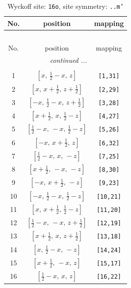 \documentclass[fleqn,8pt]{jsarticle}
\begin{document}
\renewcommand{\arraystretch}{1.2}
\begin{longtable}{ccc}
\caption{Wyckoff site: {\tt 16o}, site symmetry: {\tt ..m'}}
 \\
 \hline \hline
No. & position & mapping \\ \hline \endfirsthead

\multicolumn{2}{l}{\tablename\ \thetable{}} \\
 \hline \hline
No. & position & mapping \\ \hline \endhead

 \hline \hline
\multicolumn{2}{r}{\footnotesize\it continued ...} \\ \endfoot

 \hline \hline
\multicolumn{2}{r}{} \\ \endlastfoot

1 & $\left[ x,\, \frac{1}{2} - x,\, z \right]$ & {\tt [1,31]} \\ \hline
2 & $\left[ x,\, x + \frac{1}{2},\, z + \frac{1}{2} \right]$ & {\tt [2,29]} \\ \hline
3 & $\left[ - x,\, \frac{1}{2} - x,\, z + \frac{1}{2} \right]$ & {\tt [3,28]} \\ \hline
4 & $\left[ x + \frac{1}{2},\, x,\, \frac{1}{2} - z \right]$ & {\tt [4,27]} \\ \hline
5 & $\left[ \frac{1}{2} - x,\, - x,\, \frac{1}{2} - z \right]$ & {\tt [5,26]} \\ \hline
6 & $\left[ - x,\, x + \frac{1}{2},\, z \right]$ & {\tt [6,32]} \\ \hline
7 & $\left[ \frac{1}{2} - x,\, x,\, - z \right]$ & {\tt [7,25]} \\ \hline
8 & $\left[ x + \frac{1}{2},\, - x,\, - z \right]$ & {\tt [8,30]} \\ \hline
9 & $\left[ - x,\, x + \frac{1}{2},\, - z \right]$ & {\tt [9,23]} \\ \hline
10 & $\left[ - x,\, \frac{1}{2} - x,\, \frac{1}{2} - z \right]$ & {\tt [10,21]} \\ \hline
11 & $\left[ x,\, x + \frac{1}{2},\, \frac{1}{2} - z \right]$ & {\tt [11,20]} \\ \hline
12 & $\left[ \frac{1}{2} - x,\, - x,\, z + \frac{1}{2} \right]$ & {\tt [12,19]} \\ \hline
13 & $\left[ x + \frac{1}{2},\, x,\, z + \frac{1}{2} \right]$ & {\tt [13,18]} \\ \hline
14 & $\left[ x,\, \frac{1}{2} - x,\, - z \right]$ & {\tt [14,24]} \\ \hline
15 & $\left[ x + \frac{1}{2},\, - x,\, z \right]$ & {\tt [15,17]} \\ \hline
16 & $\left[ \frac{1}{2} - x,\, x,\, z \right]$ & {\tt [16,22]} \\
\end{longtable}
\end{document}
